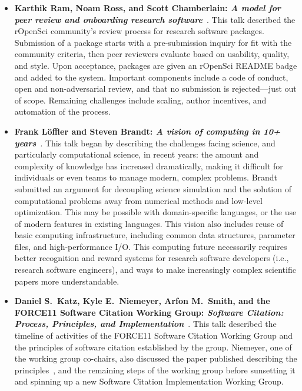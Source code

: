 \documentclass[11pt, oneside]{amsart}
\begin{document}
\begin{itemize}[itemsep=1ex]
    \item \textbf{Karthik Ram\textsuperscript{\textasteriskcentered}, Noam Ross,
    and Scott Chamberlain: \emph{A model for
    peer review and onboarding research software}}~\cite{Ram:2016ws}.
    This talk described the rOpenSci community's review process for research
    software packages. Submission of a package starts with a pre-submission inquiry
    for fit with the community criteria, then peer reviewers evaluate based on
    usability, quality, and style. Upon acceptance, packages are given an rOpenSci
    README badge and added to the system. Important components include a code of
    conduct, open and non-adversarial review, and that no submission is
    rejected---just out of scope. Remaining challenges include scaling, author
    incentives, and automation of the process.

    \item \textbf{Frank L\"{o}ffler and Steven Brandt\textsuperscript{\textasteriskcentered}:
    \emph{A vision of computing in 10+ years}}~\cite{Loffler:2016ws}.
    This talk began by describing the challenges facing science, and particularly
    computational science, in recent years: the amount and complexity of knowledge
    has increased dramatically, making it difficult for individuals or even teams to
    manage modern, complex problems.
    Brandt submitted an argument for decoupling science simulation and
    the solution of computational problems away from numerical methods and low-level
    optimization. This may be possible with domain-specific languages, or the use
    of modern features in existing languages. This vision also includes reuse of
    basic computing infrastructure, including common data structures, parameter files,
    and high-performance I\slash O. This computing future necessarily requires
    better recognition and reward systems for research software developers (i.e.,
    research software engineers), and ways to make increasingly complex scientific
    papers more understandable.


    \item \textbf{Daniel S.~Katz, Kyle E.~Niemeyer\textsuperscript{\textasteriskcentered},
    Arfon M.~Smith, and the FORCE11 Software Citation Working Group:
    \emph{Software Citation: Process, Principles, and Implementation}}~\cite{Katz:2016ws}.
    This talk described the timeline of activities of the FORCE11 Software Citation
    Working Group and the principles of software citation established by the group.
    Niemeyer, one of the working group co-chairs, also discussed the paper published
    describing the principles~\cite{Smith:2016sc}, and the remaining steps of the
    working group before sunsetting it and spinning up a new Software Citation
    Implementation Working Group.


\end{itemize}
\end{document}
